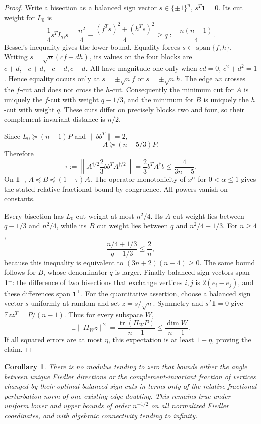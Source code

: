 \documentclass[11pt]{article}
\newtheorem{corollary}[theorem]{Corollary}
\newcommand{\one}{\boldsymbol 1}
\begin{document}
\begin{proof}
Write a bisection as a balanced sign vector
$s\in\{\pm1\}^n$, $s^T\one=0$. Its cut weight for $L_0$ is
\[
 \frac14s^TL_0s
 =\frac{n^2}{4}-\frac{(f^Ts)^2+(h^Ts)^2}{4}
 \ge q:=\frac{n(n-1)}4.
\]
Bessel's inequality gives the lower bound. Equality forces
$s\in\operatorname{span}\{f,h\}$. Writing
$s=\sqrt n(cf+dh)$, its values on the four blocks are
$c+d,-c+d,-c-d,c-d$. All have magnitude one only when $cd=0$,
$c^2+d^2=1$. Hence equality occurs only at
$s=\pm\sqrt n f$ or $s=\pm\sqrt n h$.
The edge $uv$ crosses the $f$-cut and does not cross the $h$-cut.
Consequently the minimum cut for $A$ is uniquely the $f$-cut with
weight $q-1/3$, and the minimum for $B$ is uniquely the $h$-cut
with weight $q$. These cuts differ on precisely blocks two and four,
so their complement-invariant distance is $n/2$.

Since $L_0\succeq(n-1)P$ and $\|bb^T\|=2$,
\[
 A\succeq(n-5/3)P.
\]
Therefore
\[
 \tau:=\left\|A^{\dagger/2}\frac23bb^TA^{\dagger/2}\right\|
 =\frac23b^TA^\dagger b\le\frac{4}{3n-5}.
\]
On $\one^\perp$, $A\preceq B\preceq(1+\tau)A$.
The operator monotonicity of $x^\alpha$ for $0<\alpha\le1$
gives the stated relative fractional bound by congruence. All powers
vanish on constants.

Every bisection has $L_0$ cut weight at most $n^2/4$.
Its $A$ cut weight lies between $q-1/3$ and $n^2/4$, while its
$B$ cut weight lies between $q$ and $n^2/4+1/3$.
For $n\ge4$,
\[
 \frac{n/4+1/3}{q-1/3}\le\frac2n,
\]
because this inequality is equivalent to $(3n+2)(n-4)\ge0$.
The same bound follows for $B$, whose denominator $q$ is larger.
Finally balanced sign vectors span $\one^\perp$: the difference of
two bisections that exchange vertices $i,j$ is $2(e_i-e_j)$,
and these differences span $\one^\perp$.
For the quantitative assertion, choose a balanced sign vector $s$
uniformly at random and set $z=s/\sqrt n$. Symmetry and $s^T\one=0$
give $\mathbb E zz^T=P/(n-1)$. Thus for every subspace $W$,
\[
 \mathbb E\|\Pi_Wz\|^2=\frac{\operatorname{tr}(\Pi_WP)}{n-1}
 \le\frac{\dim W}{n-1}.
\]
If all squared errors are at most $\eta$, this expectation is at least
$1-\eta$, proving the claim.
\end{proof}

\begin{corollary}
There is no modulus tending to zero that bounds either the angle
between unique Fiedler directions or the complement-invariant fraction
of vertices changed by their optimal balanced sign cuts in terms only
of the relative fractional perturbation norm of one existing-edge
doubling. This remains true under uniform lower and upper bounds
of order $n^{-1/2}$ on all normalized Fiedler coordinates, and with
algebraic connectivity tending to infinity.
\end{corollary}
\end{document}
